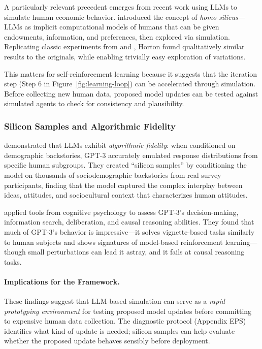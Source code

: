 A particularly relevant precedent emerges from recent work using LLMs to 
simulate human economic behavior. \citet{horton2023} introduced the concept 
of \emph{homo silicus}---LLMs as implicit computational models of humans that 
can be given endowments, information, and preferences, then explored via 
simulation. Replicating classic experiments from \citet{charness2002} and 
\citet{kahneman1986}, Horton found qualitatively similar results to the 
originals, while enabling trivially easy exploration of variations.

This matters for self-reinforcement learning because it suggests that the 
iteration step (Step 6 in Figure~\ref{fig:learning-loop}) can be accelerated 
through simulation. Before collecting new human data, proposed model updates 
can be tested against simulated agents to check for consistency and 
plausibility.

\subsubsection{Silicon Samples and Algorithmic Fidelity}

\citet{argyle2023} demonstrated that LLMs exhibit \emph{algorithmic fidelity}: 
when conditioned on demographic backstories, GPT-3 accurately emulated response 
distributions from specific human subgroups. They created ``silicon samples'' 
by conditioning the model on thousands of sociodemographic backstories from 
real survey participants, finding that the model captured the complex interplay 
between ideas, attitudes, and sociocultural context that characterizes human 
attitudes.

\citet{binz2023} applied tools from cognitive psychology to assess GPT-3's 
decision-making, information search, deliberation, and causal reasoning 
abilities. They found that much of GPT-3's behavior is impressive---it solves 
vignette-based tasks similarly to human subjects and shows signatures of 
model-based reinforcement learning---though small perturbations can lead it 
astray, and it fails at causal reasoning tasks.

\paragraph{Implications for the Framework.}
These findings suggest that LLM-based simulation can serve as a \emph{rapid 
prototyping environment} for testing proposed model updates before committing 
to expensive human data collection. The diagnostic protocol (Appendix EPS) 
identifies what kind of update is needed; silicon samples can help evaluate 
whether the proposed update behaves sensibly before deployment.


